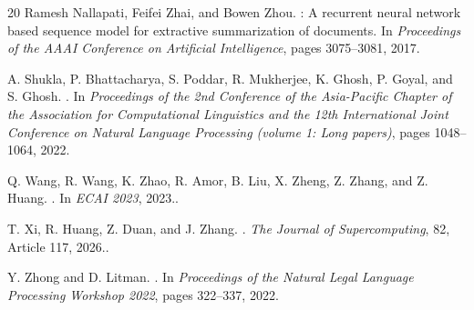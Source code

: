 \documentclass[10pt,twocolumn,letterpaper]{article}
\begin{document}
{\begin{thebibliography}{20}
Ramesh Nallapati, Feifei Zhai, and Bowen Zhou.
: A recurrent neural network based sequence model for
  extractive summarization of documents.
\newblock In \emph{Proceedings of the AAAI Conference on Artificial
  Intelligence}, pages 3075--3081, 2017.

A. Shukla, P. Bhattacharya, S. Poddar, R. Mukherjee, K. Ghosh, P. Goyal, and S.
  Ghosh.
.
\newblock In \emph{Proceedings of the 2nd Conference of the Asia-Pacific
  Chapter of the Association for Computational Linguistics and the 12th
  International Joint Conference on Natural Language Processing (volume 1: Long
  papers)}, pages 1048--1064, 2022.

Q. Wang, R. Wang, K. Zhao, R. Amor, B. Liu, X. Zheng, Z. Zhang, and Z. Huang.
.
\newblock In \emph{ECAI 2023}, 2023.\newblock {}.

T. Xi, R. Huang, Z. Duan, and J. Zhang.
.
\newblock \emph{The Journal of Supercomputing}, 82, Article 117, 2026.\newblock {}.

Y. Zhong and D. Litman.
.
\newblock In \emph{Proceedings of the Natural Legal Language Processing
  Workshop 2022}, pages 322--337, 2022.

\end{thebibliography}
}

\appendix
\raggedbottom
\end{document}
